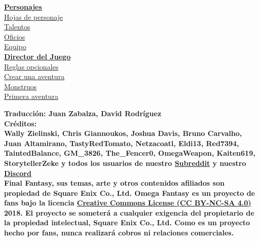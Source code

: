 \documentclass[a4paper,twocolumn,titlepage] {article}
\begin{document}
\begin{titlepage}
\begin{center}
	\vspace{0.5cm} \hyperlink{char}{\bf Personajes}  \\
	\hspace{1cm} \hyperlink{cs}{Hojas de personaje}  \\ 
	\hspace{1cm} \hyperlink{talent}{Talentos}  \\ 
	\hspace{1cm} \hyperlink{job}{Oficios}  \\ 
	\hspace{1cm} \hyperlink{equip}{Equipo}  \\ 
	\vspace{0.5cm} \hyperlink{gm}{\bf Director del Juego}  \\
	\hspace{1cm} \hyperlink{optrules}{Reglas opcionales}  \\ 
	\hspace{1cm} \hyperlink{world}{Crear una aventura}  \\ 
	\hspace{1cm} \hyperlink{monster}{Monstruos}  \\ 
	\hspace{1cm} \hyperlink{coc}{Primera aventura}  \\ 
	\end{center}
	\vfill
	\begin{center} 
	\footnotesize
	\textbf{
		 {\large Traducción: Juan Zabalza, David Rodríguez} \vspace{0.5cm}\\		
 Créditos: \\
 Wally Zielinski, Chris Giannoukos, Joshua Davis, Bruno Carvalho, Juan Altamirano, TastyRedTomato, Netzacoatl, Eldi13, Red7394, TaintedBalance, GM\_3826, The\_Fencer0, OmegaWeapon, Kaiten619, StorytellerZeke y todos los usuarios de nuestro \href{https://old.reddit.com/r/omegafantasy}{Subreddit} y nuestro \href{https://discordapp.com/invite/F5fpxMs}{Discord} \vspace{0.3cm} \\
 Final Fantasy, sus temas, arte y otros contenidos afiliados son propiedad de Square Enix Co., Ltd. Omega Fantasy es un proyecto de fans bajo la licencia \href{https://creativecommons.org/licenses/by-nc-sa/4.0/}{Creative Commons License (CC BY-NC-SA 4.0)} 2018. El proyecto se someterá a cualquier exigencia del propietario de la propiedad intelectual, Square Enix Co., Ltd. Como es un proyecto hecho por fans, nunca realizará cobros ni relaciones comerciales.
	}
	\end{center} 
\end{titlepage}

\standardgeometry














\end{document}
